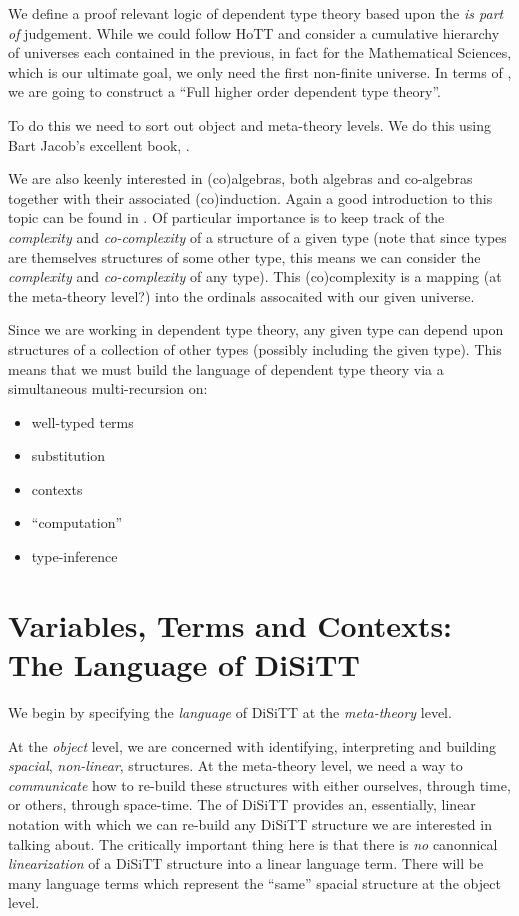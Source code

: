 \documentclass[a4paper,openany]{amsbook}
\begin{document}
We define a proof relevant logic of dependent type theory based upon the
\emph{is part of} judgement. While we could follow HoTT and consider a
cumulative hierarchy of universes each contained in the previous, in fact for
the Mathematical Sciences, which is our ultimate goal, we only need the first
non-finite universe. In terms of \cite[Chapter 11]{jacobs1999catLogicTypeTh}, we
are going to construct a ``Full higher order dependent type theory''. 

To do this we need to sort out object and meta-theory levels. We do this using
Bart Jacob's excellent book, \cite{jacobs1999catLogicTypeTh}.

We are also keenly interested in (co)algebras, both algebras and co-algebras
together with their associated (co)induction. Again a good introduction to this
topic can be found in \cite{jacobs2012coalg}. Of particular importance is to
keep track of the \emph{complexity} and \emph{co-complexity} of a structure of a
given type (note that since types are themselves structures of some other type,
this means we can consider the \emph{complexity} and \emph{co-complexity} of any
type). This (co)complexity is a mapping (at the meta-theory level?) into the
ordinals assocaited with our given universe.

Since we are working in dependent type theory, any given type can depend upon
structures of a collection of other types (possibly including the given type). 
This means that we must build the language of dependent type theory
via a simultaneous multi-recursion on:
%
\begin{itemize}
  \item well-typed terms
  \item substitution
  \item contexts
  \item ``computation''
  \item type-inference
\end{itemize} 
%

\section{Variables, Terms and Contexts: The Language of DiSiTT}

We begin by specifying the \emph{language} of DiSiTT at the \emph{meta-theory}
level.

At the \emph{object} level, we are concerned with identifying, interpreting and
building \emph{spacial}, \emph{non-linear}, structures. At the meta-theory
level, we need a way to \emph{communicate} how to re-build these structures with
either ourselves, through time, or others, through space-time. The
 of DiSiTT provides an, essentially, linear notation with
which we can re-build any DiSiTT structure we are interested in talking about.
The critically important thing here is that there is \emph{no} canonnical
\emph{linearization} of a DiSiTT structure into a linear language term.  There
will be many language terms which represent the ``same'' spacial structure at
the object level.
\end{document}
